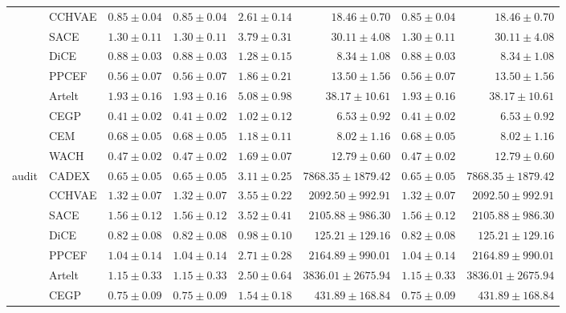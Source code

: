 \begin{table}[ht]
\begin{center}
\begin{sc}
\begin{scriptsize}
\begin{tabular}{l|l|rrrrrr}
 & CCHVAE & $0.85\pm{0.04}$ & $0.85\pm{0.04}$ & $2.61\pm{0.14}$ & $18.46\pm{0.70}$ & $0.85\pm{0.04}$ & $18.46\pm{0.70}$ \\
 & SACE & $1.30\pm{0.11}$ & $1.30\pm{0.11}$ & $3.79\pm{0.31}$ & $30.11\pm{4.08}$ & $1.30\pm{0.11}$ & $30.11\pm{4.08}$ \\
 & DiCE & $0.88\pm{0.03}$ & $0.88\pm{0.03}$ & $1.28\pm{0.15}$ & $8.34\pm{1.08}$ & $0.88\pm{0.03}$ & $8.34\pm{1.08}$ \\
 & PPCEF & $0.56\pm{0.07}$ & $0.56\pm{0.07}$ & $1.86\pm{0.21}$ & $13.50\pm{1.56}$ & $0.56\pm{0.07}$ & $13.50\pm{1.56}$ \\
 & Artelt & $1.93\pm{0.16}$ & $1.93\pm{0.16}$ & $5.08\pm{0.98}$ & $38.17\pm{10.61}$ & $1.93\pm{0.16}$ & $38.17\pm{10.61}$ \\
 & CEGP & $\boldsymbol{0.41\pm{0.02}}$ & $\boldsymbol{0.41\pm{0.02}}$ & $\boldsymbol{1.02\pm{0.12}}$ & $\boldsymbol{6.53\pm{0.92}}$ & $\boldsymbol{0.41\pm{0.02}}$ & $\boldsymbol{6.53\pm{0.92}}$ \\
 & CEM & $0.68\pm{0.05}$ & $0.68\pm{0.05}$ & $1.18\pm{0.11}$ & $8.02\pm{1.16}$ & $0.68\pm{0.05}$ & $8.02\pm{1.16}$ \\
 & WACH & $0.47\pm{0.02}$ & $0.47\pm{0.02}$ & $1.69\pm{0.07}$ & $12.79\pm{0.60}$ & $0.47\pm{0.02}$ & $12.79\pm{0.60}$ \\
\midrule
\multirow{9}{*}{audit} & CADEX & $\boldsymbol{0.65\pm{0.05}}$ & $\boldsymbol{0.65\pm{0.05}}$ & $3.11\pm{0.25}$ & $7868.35\pm{1879.42}$ & $\boldsymbol{0.65\pm{0.05}}$ & $7868.35\pm{1879.42}$ \\
 & CCHVAE & $1.32\pm{0.07}$ & $1.32\pm{0.07}$ & $3.55\pm{0.22}$ & $2092.50\pm{992.91}$ & $1.32\pm{0.07}$ & $2092.50\pm{992.91}$ \\
 & SACE & $1.56\pm{0.12}$ & $1.56\pm{0.12}$ & $3.52\pm{0.41}$ & $2105.88\pm{986.30}$ & $1.56\pm{0.12}$ & $2105.88\pm{986.30}$ \\
 & DiCE & $0.82\pm{0.08}$ & $0.82\pm{0.08}$ & $\boldsymbol{0.98\pm{0.10}}$ & $\boldsymbol{125.21\pm{129.16}}$ & $0.82\pm{0.08}$ & $\boldsymbol{125.21\pm{129.16}}$ \\
 & PPCEF & $1.04\pm{0.14}$ & $1.04\pm{0.14}$ & $2.71\pm{0.28}$ & $2164.89\pm{990.01}$ & $1.04\pm{0.14}$ & $2164.89\pm{990.01}$ \\
 & Artelt & $1.15\pm{0.33}$ & $1.15\pm{0.33}$ & $2.50\pm{0.64}$ & $3836.01\pm{2675.94}$ & $1.15\pm{0.33}$ & $3836.01\pm{2675.94}$ \\
 & CEGP & $0.75\pm{0.09}$ & $0.75\pm{0.09}$ & $1.54\pm{0.18}$ & $431.89\pm{168.84}$ & $0.75\pm{0.09}$ & $431.89\pm{168.84}$ \\

\end{tabular}
\end{scriptsize}
\end{sc}
\end{center}
\end{table}
